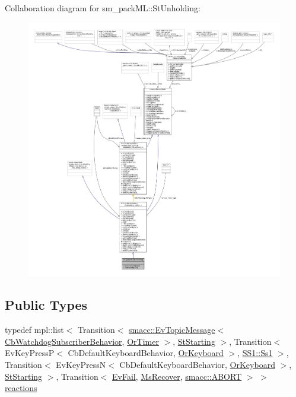 Collaboration diagram for sm\+\_\+pack\+ML\+:\+:St\+Unholding\+:
\nopagebreak
\begin{figure}[H]
\begin{center}
\leavevmode
\includegraphics[width=350pt]{structsm__packML_1_1StUnholding__coll__graph}
\end{center}
\end{figure}
\subsection*{Public Types}
\begin{DoxyCompactItemize}
\item 
typedef mpl\+::list$<$ Transition$<$ \hyperlink{structsmacc_1_1default__events_1_1EvTopicMessage}{smacc\+::\+Ev\+Topic\+Message}$<$ \hyperlink{classsm__packML_1_1cl__subscriber_1_1CbWatchdogSubscriberBehavior}{Cb\+Watchdog\+Subscriber\+Behavior}, \hyperlink{classsm__packML_1_1OrTimer}{Or\+Timer} $>$, \hyperlink{structsm__packML_1_1StStarting}{St\+Starting} $>$, Transition$<$ Ev\+Key\+PressP$<$ Cb\+Default\+Keyboard\+Behavior, \hyperlink{classsm__packML_1_1OrKeyboard}{Or\+Keyboard} $>$, \hyperlink{structsm__packML_1_1SS1_1_1Ss1}{S\+S1\+::\+Ss1} $>$, Transition$<$ Ev\+Key\+PressN$<$ Cb\+Default\+Keyboard\+Behavior, \hyperlink{classsm__packML_1_1OrKeyboard}{Or\+Keyboard} $>$, \hyperlink{structsm__packML_1_1StStarting}{St\+Starting} $>$, Transition$<$ \hyperlink{structsm__packML_1_1EvFail}{Ev\+Fail}, \hyperlink{classsm__packML_1_1MsRecover}{Ms\+Recover}, \hyperlink{structsmacc_1_1default__transition__tags_1_1ABORT}{smacc\+::\+A\+B\+O\+RT} $>$ $>$ \hyperlink{structsm__packML_1_1StUnholding_a90f0e90d3ebd1463860870e58d49ce6f}{reactions}
\end{DoxyCompactItemize}
